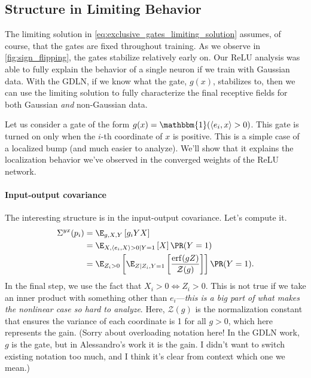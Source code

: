 \documentclass{article}
\begin{document}
\subsection{Structure in Limiting Behavior}
The limiting solution in \cref{eq:exclusive_gates_limiting_solution} assumes, of course, that the gates are fixed throughout training.
As we observe in \cref{fig:sign_flipping}, the gates stabilize relatively early on.
Our ReLU analysis was able to fully explain the behavior of a single neuron if we train with Gaussian data.
With the GDLN, if we know what the gate, $g(x)$, stabilizes to, then we can use the limiting solution to fully characterize the final receptive fields for both Gaussian \emph{and} non-Gaussian data.

Let us consider a gate of the form $g(x) = \mathbbm{1}( \langle e_i, x \rangle > 0)$.
This gate is turned on only when the $i$-th coordinate of $x$ is positive.
This is a simple case of a localized bump (and much easier to analyze).
We'll show that it explains the localization behavior we've observed in the converged weights of the ReLU network.

\paragraph*{Input-output covariance}
The interesting structure is in the input-output covariance.
Let's compute it.
\begin{align}
  \Sigma^{yx}(p_i) 
  &= \E_{g,X,Y} \left[ g_i Y X \right] \\
  &= \E_{X, \langle e_i, X \rangle > 0 \mid Y=1} \left[ X \right] \PR( Y=1 ) \\
  &= \E_{ Z_i > 0 } \left[ \E_{ Z \mid Z_i, Y=1 } \left[ \frac{ \operatorname{erf}( g Z ) }{ \mathcal{Z}(g) } \right] \right] \PR( Y=1 ).
\end{align}
In the final step, we use the fact that $X_i > 0 \iff Z_i > 0$.
This is not true if we take an inner product with something other than $e_i$—\emph{this is a big part of what makes the nonlinear case so hard to analyze}.
Here, $\mathcal{Z}(g)$ is the normalization constant that ensures the variance of each coordinate is 1 for all $g > 0$, which here represents the gain.
(Sorry about overloading notation here! In the GDLN work, $g$ is the gate, but in Alessandro's work it is the gain.
I didn't want to switch existing notation too much, and I think it's clear from context which one we mean.)
\end{document}
